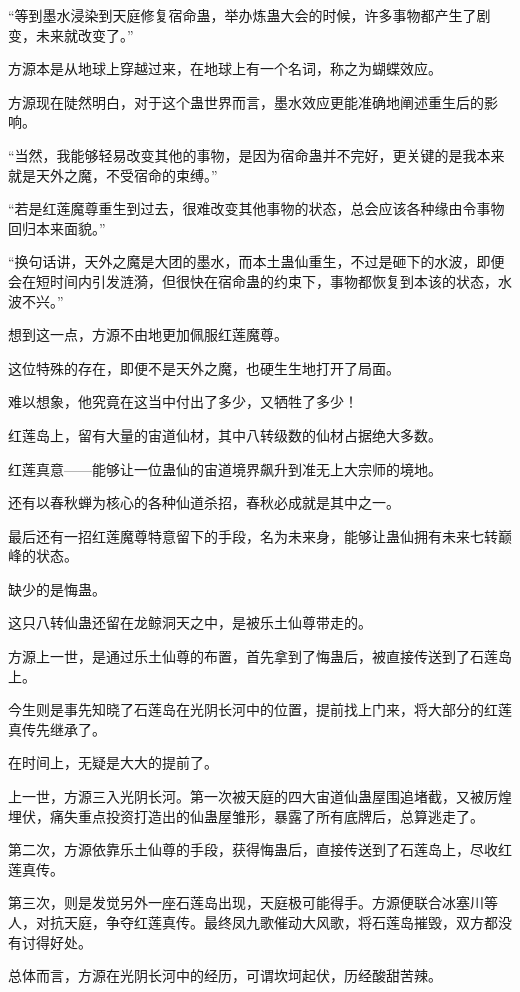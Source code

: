 \begin{this_body}
“等到墨水浸染到天庭修复宿命蛊，举办炼蛊大会的时候，许多事物都产生了剧变，未来就改变了。”

方源本是从地球上穿越过来，在地球上有一个名词，称之为蝴蝶效应。

方源现在陡然明白，对于这个蛊世界而言，墨水效应更能准确地阐述重生后的影响。

“当然，我能够轻易改变其他的事物，是因为宿命蛊并不完好，更关键的是我本来就是天外之魔，不受宿命的束缚。”

“若是红莲魔尊重生到过去，很难改变其他事物的状态，总会应该各种缘由令事物回归本来面貌。”

“换句话讲，天外之魔是大团的墨水，而本土蛊仙重生，不过是砸下的水波，即便会在短时间内引发涟漪，但很快在宿命蛊的约束下，事物都恢复到本该的状态，水波不兴。”

想到这一点，方源不由地更加佩服红莲魔尊。

这位特殊的存在，即便不是天外之魔，也硬生生地打开了局面。

难以想象，他究竟在这当中付出了多少，又牺牲了多少！

红莲岛上，留有大量的宙道仙材，其中八转级数的仙材占据绝大多数。

红莲真意——能够让一位蛊仙的宙道境界飙升到准无上大宗师的境地。

还有以春秋蝉为核心的各种仙道杀招，春秋必成就是其中之一。

最后还有一招红莲魔尊特意留下的手段，名为未来身，能够让蛊仙拥有未来七转巅峰的状态。

缺少的是悔蛊。

这只八转仙蛊还留在龙鲸洞天之中，是被乐土仙尊带走的。

方源上一世，是通过乐土仙尊的布置，首先拿到了悔蛊后，被直接传送到了石莲岛上。

今生则是事先知晓了石莲岛在光阴长河中的位置，提前找上门来，将大部分的红莲真传先继承了。

在时间上，无疑是大大的提前了。

上一世，方源三入光阴长河。第一次被天庭的四大宙道仙蛊屋围追堵截，又被厉煌埋伏，痛失重点投资打造出的仙蛊屋雏形，暴露了所有底牌后，总算逃走了。

第二次，方源依靠乐土仙尊的手段，获得悔蛊后，直接传送到了石莲岛上，尽收红莲真传。

第三次，则是发觉另外一座石莲岛出现，天庭极可能得手。方源便联合冰塞川等人，对抗天庭，争夺红莲真传。最终凤九歌催动大风歌，将石莲岛摧毁，双方都没有讨得好处。

总体而言，方源在光阴长河中的经历，可谓坎坷起伏，历经酸甜苦辣。


\end{this_body}
